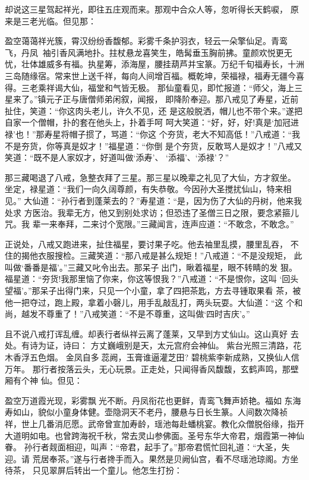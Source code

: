 却说这三星驾起祥光，即往五庄观而来。那观中合众人等，忽听得长天鹤唳，
原来是三老光临。但见那：

盈空蔼蔼祥光簇，霄汉纷纷香馥郁。彩雾千条护羽衣，轻云一朵擎仙足。青鸾
飞，丹凤，袖引香风满地扑。拄杖悬龙喜笑生，皓髯垂玉胸前拂。童颜欢悦更无
忧，壮体雄威多有福。执星筹，添海屋，腰挂葫芦并宝篆。万纪千旬福寿长，十洲
三岛随缘宿。常来世上送千祥，每向人间增百福。概乾坤，荣福禄，福寿无疆今喜
得。三老乘祥谒大仙，福堂和气皆无极。
那仙童看见，即忙报道：“师父，海上三星来了。”镇元子正与唐僧师弟闲叙，闻报，
即降阶奉迎。那八戒见了寿星，近前扯住，笑道：“你这肉头老儿，许久不见，还
是这般脱洒，帽儿也不带个来。”遂把自家一个僧帽，扑的套在他头上，扑着手呵
呵大笑道：“好，好，好!真是‘加冠进禄’也！”那寿星将帽子掼了，骂道：“你这
个夯货，老大不知高低！”八戒道：“我不是夯货，你等真是奴才！”福星道：“你倒
是个夯货，反敢骂人是奴才！”八戒又笑道：“既不是人家奴才，好道叫做‘添寿’、
‘添福’、‘添禄’？”

那三藏喝退了八戒，急整衣拜了三星。那三星以晚辈之礼见了大仙，方才叙坐。
坐定，禄星道：“我们一向久阔尊颜，有失恭敬。今因孙大圣搅扰仙山，特来相见。”
大仙道：“孙行者到蓬莱去的？”寿星道：“是，因为伤了大仙的丹树，他来我处求
方医治。我辈无方，他又到别处求访；但恐违了圣僧三日之限，要念紧箍儿咒。我
辈一来奉拜，二来讨个宽限。”三藏闻言，连声应道：“不敢念，不敢念。”

正说处，八戒又跑进来，扯住福星，要讨果子吃。他去袖里乱摸，腰里乱吞，
不住的揭他衣服搜检。三藏笑道：“那八戒是甚么规矩！”八戒道：“不是没规矩，
此叫做‘番番是福’。”三藏又叱令出去。那呆子出门，瞅着福星，眼不转睛的发
狠。福星道：“夯货!我那里恼了你来，你这等恨我？”八戒道：“不是恨你，这叫
‘回头望福’。”那呆子出得门来，只见一个小童，拿了四把茶匙，方去寻锺取果看
茶，被他一把夺过，跑上殿，拿着小磬儿，用手乱敲乱打，两头玩耍。大仙道：“这
个和尚，越发不尊重了！”八戒笑道：“不是不尊重，这叫做‘四时吉庆’。”

且不说八戒打诨乱缠。却表行者纵祥云离了蓬莱，又早到方丈仙山。这山真好
去处。有诗为证，诗曰：
方丈巍峨别是天，太元宫府会神仙。
紫台光照三清路，花木香浮五色烟。
金凤自多蕊阙，玉膏谁逼灌芝田?
碧桃紫李新成熟，又换仙人信万年。
那行者按落云头，无心玩景。正走处，只闻得香风馥馥，玄鹤声鸣，那壁厢有个神
仙。但见：

盈空万道霞光现，彩雾飘光不断。丹凤衔花也更鲜，青鸾飞舞声娇艳。福如
东海寿如山，貌似小童身体健。壶隐洞天不老丹，腰悬与日长生篆。人间数次降祯
祥，世上几番消厄愿。武帝曾宣加寿龄，瑶池每赴蟠桃宴。教化众僧脱俗缘，指开
大道明如电。也曾跨海祝千秋，常去灵山参佛面。圣号东华大帝君，烟霞第一神仙
眷。
孙行者觌面相迎，叫声：“帝君，起手了。”那帝君慌忙回礼道：“大圣，失迎。请
荒居奉茶。”遂与行者搀手而入。果然是贝阙仙宫，看不尽瑶池琼阁。方坐待茶，
只见翠屏后转出一个童儿。他怎生打扮：

